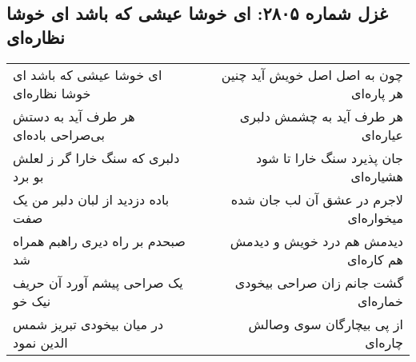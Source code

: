 \begin{center}
\section*{غزل شماره ۲۸۰۵: ای خوشا عیشی که باشد ای خوشا نظاره‌ای}
\label{sec:2805}
\begin{longtable}{l p{0.5cm} r}
ای خوشا عیشی که باشد ای خوشا نظاره‌ای
&&
چون به اصل اصل خویش آید چنین هر پاره‌ای
\\
هر طرف آید به دستش بی‌صراحی باده‌ای
&&
هر طرف آید به چشمش دلبری عیاره‌ای
\\
دلبری که سنگ خارا گر ز لعلش بو برد
&&
جان پذیرد سنگ خارا تا شود هشیاره‌ای
\\
باده دزدید از لبان دلبر من یک صفت
&&
لاجرم در عشق آن لب جان شده میخواره‌ای
\\
صبحدم بر راه دیری راهبم همراه شد
&&
دیدمش هم درد خویش و دیدمش هم کاره‌ای
\\
یک صراحی پیشم آورد آن حریف نیک خو
&&
گشت جانم زان صراحی بیخودی خماره‌ای
\\
در میان بیخودی تبریز شمس الدین نمود
&&
از پی بیچارگان سوی وصالش چاره‌ای
\\
\end{longtable}
\end{center}
